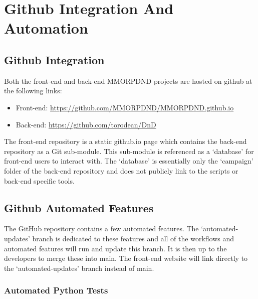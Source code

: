\chapter{Github Integration And Automation}
\thispagestyle{fancy}  %






\section{Github Integration}

Both the front-end and back-end MMORPDND projects are hosted on github at the following links:

\begin{itemize}
\item Front-end: \url{https://github.com/MMORPDND/MMORPDND.github.io}
\item Back-end: \url{https://github.com/torodean/DnD}
\end{itemize}

The front-end repository is a static github.io page which contains the back-end repository as a Git sub-module. This sub-module is referenced as a `database' for front-end users to interact with. The `database' is essentially only the `campaign' folder of the back-end repository and does not publicly link to the scripts or back-end specific tools.












\section{Github Automated Features}

The GitHub repository contains a few automated features. The `automated-updates' branch is dedicated to these features and all of the workflows and automated features will run and update this branch. It is then up to the developers to merge these into main. The front-end website will link directly to the `automated-updates' branch instead of main.


\subsection{Automated Python Tests}

